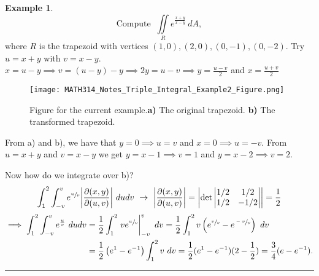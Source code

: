 \documentclass[
	12pt,
	]{article}
\theoremstyle{custom}
\theoremstyle{custom}
\theoremstyle{custom}
\theoremstyle{custom}
\theoremstyle{custom}
\theoremstyle{definition}
\newtheorem{example}{Example}[section]
\theoremstyle{example}
\theoremstyle{note}
\theoremstyle{remark}
\theoremstyle{example}
\newcounter{theo}[section]\setcounter{theo}{0}
\numberwithin{equation}{subsection}
\begin{document}
  			\begin{example} 
  			$$ \text{Compute } \ \iint\limits_R e^{\frac{x+y}{x-y}} \ dA,$$
  			where $R$ is the trapezoid with vertices $(1,0) , (2,0) , (0,-1), (0,-2).$ 
  			Try $u = x+y$ with $v = x-y$. $x = u-y \implies v = (u-y)-y \implies 2y = u-v \implies y= \frac{u-v}{2}$ and $x=\frac{u+v}{2}$
  				\begin{figure}[H]
  					\centering
  					\texttt{[image: MATH314\_Notes\_Triple\_Integral\_Example2\_Figure.png]}\captionsetup{margin=1cm, justification=raggedright}\caption{Figure for the current example.\textbf{a)} The original trapezoid. \textbf{b)} The transformed trapezoid.}
  				\end{figure}
  			\noindent From a) and b), we have that $y=0 \implies u=v$ and $x=0 \implies u=-v$. From $u = x+y$ and $v=x-y$ we get $y = x-1 \implies v=1$ and $y = x-2 \implies v=2$.
  			
  			\noindent Now how do we integrate over b)? 
  			\begin{gather*}
  				\int_{1}^{2}\int_{-v}^{v} e^{\sfrac{u}{v}} \abs{\frac{\partial (x,y)}{\partial (u,v)}} \ dudv  \ \to \
  				\abs{\frac{\partial (x,y)}{\partial (u,v)}} = \abs{\det 
  				\begin{vmatrix}
  					1/2 & 1/2 \\
  					1/2 & -1/2
  				\end{vmatrix}
  				} =\frac12 
  			\end{gather*}
  			\begin{align*}
  				\implies \int_{1}^{2}\int_{-v}^{v} e^{\frac{u}{v}} \ dudv 
  				  				&= \frac12 \int_{1}^{2} \eval{ve^{\sfrac{u}{v}}}_{-v}^{v} \ dv = \frac12 \int_{1}^{2} v \left(e^{\sfrac{v}{v}} - e^{\sfrac{-v}{v}}\right) \ dv \\
  				  				&= \frac12 \left(e^{1} - e^{-1}\right) \int_{1}^{2} v \ dv = \frac12 (e^{1} - e^{-1})(2- \frac12) = \frac34 (e-e^{-1}).
  			\end{align*}
  			\end{example}
  			
  			\rule{\linewidth}{0.4 pt}
  		
\end{document}
